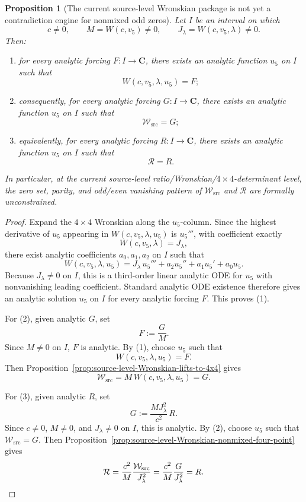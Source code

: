 \documentclass[11pt,a4paper]{amsart}
\theoremstyle{plain}
\newtheorem{proposition}[theorem]{Proposition}
\theoremstyle{definition}
\begin{document}
\begin{proposition}[The current source-level Wronskian package is not yet a contradiction engine for nonmixed odd zeros]
\label{prop:source-level-Wronskian-package-not-enough}
Let $I$ be an interval on which
\[
c\neq 0,
\qquad
M=W(c,v_5)\neq 0,
\qquad
J_\lambda=W(c,v_5,\lambda)\neq 0.
\]
Then:

\begin{enumerate}
\item for every analytic forcing $F:I\to\mathbf C$, there exists an analytic
function $u_5$ on $I$ such that
\[
W(c,v_5,\lambda,u_5)=F;
\]

\item consequently, for every analytic forcing $G:I\to\mathbf C$, there exists
an analytic function $u_5$ on $I$ such that
\[
\mathcal W_{\mathrm{src}}=G;
\]

\item equivalently, for every analytic forcing $R:I\to\mathbf C$, there exists
an analytic function $u_5$ on $I$ such that
\[
\mathcal R=R.
\]
\end{enumerate}

In particular, at the current source-level ratio/Wronskian/$4\times4$-determinant
level, the zero set, parity, and odd/even vanishing pattern of
$\mathcal W_{\mathrm{src}}$ and $\mathcal R$ are formally unconstrained.
\end{proposition}

\begin{proof}
Expand the $4\times4$ Wronskian along the $u_5$-column. Since the highest
derivative of $u_5$ appearing in $W(c,v_5,\lambda,u_5)$ is $u_5'''$, with
coefficient exactly
\[
W(c,v_5,\lambda)=J_\lambda,
\]
there exist analytic coefficients $a_0,a_1,a_2$ on $I$ such that
\[
W(c,v_5,\lambda,u_5)
=
J_\lambda\,u_5'''+a_2u_5''+a_1u_5'+a_0u_5.
\]
Because $J_\lambda\neq 0$ on $I$, this is a third-order linear analytic ODE
for $u_5$ with nonvanishing leading coefficient. Standard analytic ODE
existence therefore gives an analytic solution $u_5$ on $I$ for every
analytic forcing $F$. This proves (1).

For (2), given analytic $G$, set
\[
F:=\frac{G}{M}.
\]
Since $M\neq 0$ on $I$, $F$ is analytic. By (1), choose $u_5$ such that
\[
W(c,v_5,\lambda,u_5)=F.
\]
Then Proposition~\ref{prop:source-level-Wronskian-lifts-to-4x4} gives
\[
\mathcal W_{\mathrm{src}}
=
M\,W(c,v_5,\lambda,u_5)
=
G.
\]

For (3), given analytic $R$, set
\[
G:=\frac{M J_\lambda^2}{c^2}\,R.
\]
Since $c\neq 0$, $M\neq 0$, and $J_\lambda\neq 0$ on $I$, this is
analytic. By (2), choose $u_5$ such that $\mathcal W_{\mathrm{src}}=G$.
Then Proposition~\ref{prop:source-level-Wronskian-nonmixed-four-point} gives
\[
\mathcal R
=
\frac{c^2}{M}\frac{\mathcal W_{\mathrm{src}}}{J_\lambda^2}
=
\frac{c^2}{M}\frac{G}{J_\lambda^2}
=
R.
\qedhere
\]
\end{proof}
\end{document}

